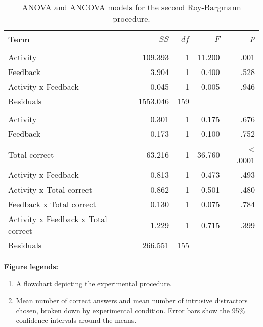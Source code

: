 \documentclass[12pt]{article}
\begin{document}
\begin{table*}

\caption{\label{tab:rb2Table}\label{rb2-table}ANOVA and ANCOVA models for the second Roy-Bargmann
                     procedure.}
\centering
\begin{tabular}[t]{lrrrr}
\toprule
Term & $SS$ & $df$ & $F$ & $p$\\
\midrule
\addlinespace[0.3em]
\multicolumn{5}{l}{\textbf{ANOVA}}\\
\hspace{1em}Activity & 109.393 & 1 & 11.200 & .001\\
\hspace{1em}Feedback & 3.904 & 1 & 0.400 & .528\\
\hspace{1em}Activity x Feedback & 0.045 & 1 & 0.005 & .946\\
\hspace{1em}Residuals & 1553.046 & 159 &  & \\
\addlinespace[0.3em]
\multicolumn{5}{l}{\textbf{ANCOVA}}\\
\hspace{1em}Activity & 0.301 & 1 & 0.175 & .676\\
\hspace{1em}Feedback & 0.173 & 1 & 0.100 & .752\\
\hspace{1em}Total correct & 63.216 & 1 & 36.760 & < .0001\\
\hspace{1em}Activity x Feedback & 0.813 & 1 & 0.473 & .493\\
\hspace{1em}Activity x Total correct & 0.862 & 1 & 0.501 & .480\\
\hspace{1em}Feedback x Total correct & 0.130 & 1 & 0.075 & .784\\
\hspace{1em}Activity x Feedback x Total correct & 1.229 & 1 & 0.715 & .399\\
\hspace{1em}Residuals & 266.551 & 155 &  & \\
\bottomrule
\end{tabular}
\end{table*}

\vspace*{2cm}

\noindent\textbf{Figure legends:}
\begin{enumerate}[label=Figure \arabic*.]
    \item A flowchart depicting the experimental procedure.
    \item Mean number of correct answers and mean number of intrusive
        distractors chosen, broken down by experimental condition. Error bars
        show the 95\% confidence intervals around the means.
\end{enumerate}
\end{document}
